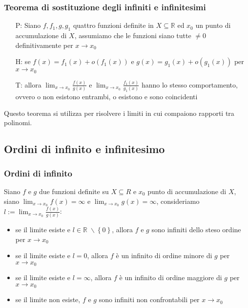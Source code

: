 \documentclass[a4paper]{article}
\begin{document}
\subsubsection*{Teorema di sostituzione degli infiniti e infinitesimi}
\begin{itemize}
	\item[P:] Siano \(f, f_1, g, g_1\) quattro funzioni definite in \(X \subseteq \mathbb{R}\) ed \(x_0\) un punto di accumulazione di \(X\),
	assumiamo che le funzioni siano tutte \(\neq 0\) definitivamente per \(x \to x_0\)
	\item[H:] se \(f(x) = f_1(x) + o(f_1(x))\) e \(g(x) = g_1(x) + o(g_1(x))\) per \(x \to x_0\)
	\item[T:] allora \(\displaystyle \lim_{x \to x_0} \frac{f(x)}{g(x)}\) e \(\displaystyle \lim_{x \to x_0} \frac{f_1(x)}{g_1(x)}\) hanno lo stesso comportamento,
	ovvero o non esistono entrambi, o esistono e sono coincidenti
\end{itemize}
Questo teorema si utilizza per risolvere i limiti in cui compaiono rapporti tra polinomi.

\subsection{Ordini di infinito e infinitesimo}
\subsubsection*{Ordini di infinito}
Siano \(f\) e \(g\) due funzioni definite su \(X \subseteq R\) e \(x_0\) punto di accumulazione di \(X\), siano \(\displaystyle \lim_{x \to x_0} f(x) = \infty\)
e \(\displaystyle \lim_{x \to x_0} g(x) = \infty\), consideriamo \(\displaystyle l := \lim_{x \to x_0} \frac{f(x)}{g(x)}\):
\begin{itemize}
	\item se il limite esiste e \(l \in \mathbb{R} \; \backslash \left\{0\right\}\), allora \(f\) e \(g\) sono infiniti dello steso ordine per \(x \to x_0\)
	\item se il limite esiste e \(l = 0\), allora \(f\) è un infinito di ordine minore di \(g\) per \(x \to x_0\)
	\item se il limite esiste e \(l = \infty\), allora \(f\) è un infinito di ordine maggiore di \(g\) per \(x \to x_0\)
	\item se il limite non esiste, \(f\) e \(g\) sono infiniti non confrontabili per \(x \to x_0\)
\end{itemize}
\end{document}
